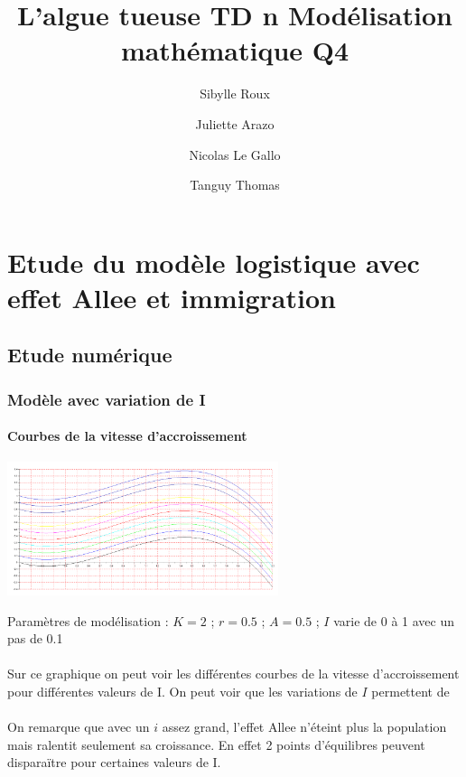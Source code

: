 \documentclass{article}
\begin{document}
\title{L'algue tueuse
	\smallbreak
	TD n
	\smallbreak
	Modélisation mathématique
	\smallbreak
	Q4}
\author{Sibylle Roux \and Juliette Arazo \and Nicolas Le Gallo \and Tanguy Thomas}


\maketitle

\newpage

\tableofcontents

\newpage

\section{Etude du modèle logistique avec effet Allee et immigration}

\subsection{Etude numérique}

\subsubsection{Modèle avec variation de I}

\paragraph{Courbes de la vitesse d'accroissement}
\begin{center}
\includegraphics[width=300px]{img/part1/AlleeI.png}
\end{center}
Paramètres de modélisation : $K=2$  ; $r=0.5$ ; $A=0.5$ ; $I$ varie de 0 à 1 avec un pas de 0.1 
\paragraph{}
Sur ce graphique on peut voir les différentes courbes de la vitesse d'accroissement pour différentes valeurs de I. On peut voir que les variations de $I$ permettent de 
\paragraph{}
On remarque que avec un $i$ assez grand, l'effet Allee n'éteint plus la population mais ralentit seulement sa croissance. En effet 2 points d'équilibres peuvent disparaïtre pour certaines valeurs de I. 
\end{document}
